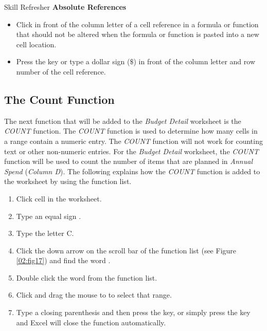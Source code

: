 \begin{center}
	\begin{sklbox}{Skill Refresher}
		\textbf{Absolute References}
		\\
		\begin{itemize}
			\setlength{\itemsep}{0pt}
			\setlength{\parskip}{0pt}
			\setlength{\parsep}{0pt}
			
			\item Click in front of the column letter of a cell reference in a formula or function that should not be altered when the formula or function is pasted into a new cell location.
			\item Press the  key or type a dollar sign ($ \$ $) in front of the column letter and row number of the cell reference.

		\end{itemize}
	\end{sklbox}
\end{center}

\subsection{The Count Function}

The next function that will be added to the \textit{Budget Detail} worksheet is the \textit{COUNT} function. The \textit{COUNT} function is used to determine how many cells in a range contain a numeric entry. The \textit{COUNT} function will not work for counting text or other non-numeric entries. For the \textit{Budget Detail} worksheet, the \textit{COUNT} function will be used to count the number of items that are planned in \textit{Annual Spend} (\textit{Column D}). The following explains how the \textit{COUNT} function is added to the worksheet by using the function list.

\begin{enumbox}
	\begin{enumerate}
		\item Click cell  in the  worksheet.
		\item Type an equal sign \fmtTyping{=}.
		\item Type the letter C.
		\item Click the down arrow on the scroll bar of the function list (see Figure \ref{02:fig17}) and find the word .
		\item Double click the word  from the function list.
		\item Click  and drag the mouse to  to select that range.
		\item Type a closing parenthesis \fmtTyping{)} and then press the  key, or simply press the  key and Excel will close the function automatically.
	\end{enumerate}
\end{enumbox}

